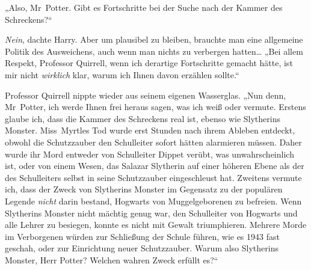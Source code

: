 „Also, Mr~Potter. Gibt es Fortschritte bei der Suche nach der Kammer des Schreckens?“

\emph{Nein}, dachte Harry. Aber um plausibel zu bleiben, brauchte man eine allgemeine Politik des Ausweichens, auch wenn man nichts zu verbergen hatten… „Bei allem Respekt, Professor Quirrell, wenn ich derartige Fortschritte gemacht hätte, ist mir nicht \emph{wirklich} klar, warum ich Ihnen davon erzählen sollte.“

Professor Quirrell nippte wieder aus seinem eigenen Wasserglas. „Nun denn, Mr~Potter, ich werde Ihnen frei heraus sagen, was ich weiß oder vermute. Erstens glaube ich, dass die Kammer des Schreckens real ist, ebenso wie Slytherins Monster. Miss~Myrtles Tod wurde erst Stunden nach ihrem Ableben entdeckt, obwohl die Schutzzauber den Schulleiter sofort hätten alarmieren müssen. Daher wurde ihr Mord entweder von Schulleiter Dippet verübt, was unwahrscheinlich ist, oder von einem Wesen, das Salazar Slytherin auf einer höheren Ebene als der des Schulleiters selbst in seine Schutzzauber eingeschleust hat. Zweitens vermute ich, dass der Zweck von Slytherins Monster im Gegensatz zu der populären Legende \emph{nicht} darin bestand, Hogwarts von Muggelgeborenen zu befreien. Wenn Slytherins Monster nicht mächtig genug war, den Schulleiter von Hogwarts und alle Lehrer zu besiegen, konnte es nicht mit Gewalt triumphieren. Mehrere Morde im Verborgenen würden zur Schließung der Schule führen, wie es 1943 fast geschah, oder zur Einrichtung neuer Schutzzauber. Warum also Slytherins Monster, Herr Potter? Welchen wahren Zweck erfüllt es?“

